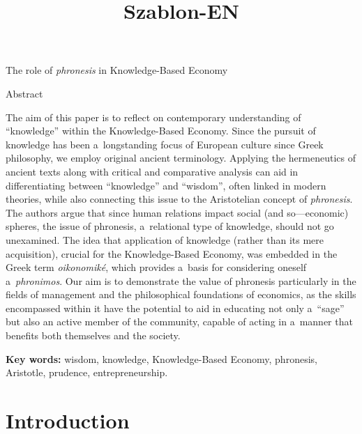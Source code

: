\setcounter{secnumdepth}{1}





\title{Szablon-EN}



The role of \textit{phronesis} in Knowledge-Based Economy





Abstract



The aim of this paper is to reflect on contemporary understanding of ``knowledge'' within the Knowledge-Based Economy. Since the pursuit of knowledge has been a~longstanding focus of European culture since Greek philosophy, we employ original ancient terminology. Applying the hermeneutics of ancient texts along with critical and comparative analysis can aid in differentiating between ``knowledge'' and ``wisdom'', often linked in modern theories, while also connecting this issue to the Aristotelian concept of \textit{phronesis}. The authors argue that since human relations impact social (and so---economic) spheres, the issue of phronesis, a~relational type of knowledge, should not go unexamined. The idea that application of knowledge (rather than its mere acquisition), crucial for the Knowledge-Based Economy, was embedded in the Greek term \textit{oikonomiké}, which provides a~basis for considering oneself a~\textit{phronimos}. Our aim is to demonstrate the value of phronesis particularly in the fields of management and the philosophical foundations of economics, as the skills encompassed within it have the potential to aid in educating not only a~``sage'' but also an active member of the community, capable of acting in a~manner that benefits both themselves and the society.



\textbf{Key words:} wisdom, knowledge, Knowledge-Based Economy, phronesis, Aristotle, prudence, entrepreneurship.



\section{Introduction}

